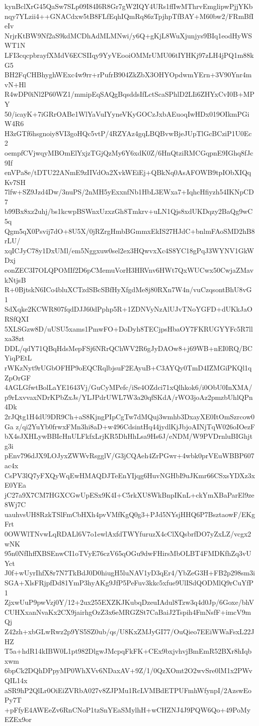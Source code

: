 kynBclXrG45QaSw7SLp09I84I6R8Gr7gW2IQY4URs1ffIwMThrvEmglipwPjjYKb
nqy7YLzii4++GNACdxw5tB8FLfEqhIQmRq86zTpjhpTfBAY+M60bw2/FRmBfIeIv
NrjrKtBW9Nf2aS9kdMCDhAdMLMNwi/y6Q+gKjL8WuXjunjys9BIq1eodHyWSWT1N
LFI3cqcpbrayfXMdV6ECSIIqy9YyVEooiOMMrUMU06tIYHKj97zLH4jPQ1m88kG5
BH2FqCHBhyghWExc4w9rr+rPufrB904ZkZbX3OHYOpdwmYErn+3V90Ynr4mvN+Hl
R4wDP0iNl2P60WZ1/mmipEqSAQgBqsddsIfLctScaSPhlD2LIi6ZHYxCvI0B+MPY
50/icayK+7iGRrOABe1WlYaVuIYyneVKyGOCzJxbAEuoqIwHDx019OIkmPGiW4R6
H3zGTf6hsgnoiy8VI3goHQc5vtP/4RZYAz4gqLBQBvwBjeJUpTlGcBCziP1U0Ec2
oempfCVjwqyMBOmElYxjzTGjQzMy6Y6xdK0Z/6HnQtziRMCGqpnE9IGhq8fJc9If
enVPa8e/tDTU22ANmE9zIIVdOa2XvkWEiEj+QBkNq0AsAFOWB9tpIObXIQqKv7SH
7lfw+SZ9Jzd4Dw/3nuPS/2nMH5yExxnfNb1HbL3EWxa7+IqhcHfiyzh54IKNpCD7
b99Bx8xz2uhj/bs1kcwpBSWnxUzxzGh8Tmkrv+uLN1Qjs8xdUKDqzy2BaQg9wC5q
Qgm5qX0Psvij7dO+8U5X/0jRZrgHmbBGmmxEkIS27HJdC+bnlmFAoSMD2hB8rLU/
xqICJyC78y1DxUMl/em5Nggxuw0sel2ex3HQwvxXc4S8YC18gPqJ3WYNV1GkWDxj
eonZEC3I7OLQPOMIf2D6pCMemuVorH3HRVnv6HWt7QxWUCwx50CwjaZMavkNtjsB
R+0BjtskN6ICo4bluXCTzdSBcSBfHyXfgdMe8j80RXn7W4n/vuCzqsontBhU8vG1
SdXqke2KCWR807fqdDJJ60dPphp5R+1ZDNVyNzAlUJvTNoYGFD+dUKkJaORSfQXI
5XLSGzw8D/uUSU5xams1PmwFO+DoDyh8TECjpsHbaOY7FKRUGYYFc5R7llxa38zt
DDL/qdY71QBqHdsMepFSj6NRrQChWV2R6gJyDAOw8+j69WB+nEI0RQ/BCYiqPEtL
rWKzNyt9rUGbOFHP9oEQCRqlbjsuF2EAyuB+C3AYQy0TmD4IZMGiPKQl1qZpOrGF
4AGLGfwtBolLaYE1643Vj/GuCyMPefc/iSe4OZdci71xQlhkok6/i0ObU0InXMA/
p9rLxvvaxNDrKPbZxJs/YLJPdrUWL7W3a20qfSKdA/rWO3joAz2pmzbUhlQPn4Dk
2rJQtg1H4dU9DR9Ch+aS8KjngPIpCgTw7dMQuj3wmhb3DxayXE0ItOmSzrcow0Ga
z/qi2YuYb0frwxFMn3hi8aD+w496CdsintHq44jydlKjJbjoAINjTqW026oIOezF
bX4sJXHLywBBIcHnULFkfxLrjKR5DhHhLsa9Hs6J/eNDM/W9PVDrnluBIGhjtg3i
pEnv796dJX9LOJyxZWWvRsgglV/G3jCQAeh4ZrPGwr+4wbk0prVEuWBBP607ac4x
CsPV3lQ7yFXQyWqEwHMAQDJTeEnYIjqg6HuvNGHbI9uJKmr66CSxsYDXz3xE0YEa
jC27a9X7CM7HGXCGwUpESx9K4I+C5rkXU8WkBnpIKnL+ckYmXBaParEl9ze8Wj7C
uauhvsUH8RzkTSlFmCbHXh4pvVMfKgQ0g3+PJd5NYsjHHQ6P7BsztaowF/EKgFrt
0OWWlTNvwLqRDALl6V7o1ewlAxfdTWYfuruzX4cClXQsbrfDO7yZxLZ/vcgx2wNK
95n0NfIhffXBSEnwCI1oTVyE76czV65qOGu9dwFHirsMbOLBT4FMDKfhZq3vUYct
J0f+wUyrIhfX8r7N7TkBdJ0D0hiugH5luNAV1yD3qEr4/YbZeG3H+FB2p298sm3i
SGA+XlsFRjpfDd81YmP3hyAKg9JfP5PeFuv3kkc5xfue9UlISdQODMlQ9rCuYfP1
ZjxwUuP9pwVzj0Y/12+2ux255EXZKJKubqDzeuIAdul8Tzw3q4d0Jp/6Goxe/bhV
CUHXxanNvaKx2CX9jairhgOzZ3x6eMRGZSt7CaBaiJ2Tspih4FmNsfF+imcV9mQj
Z42zh+xbGLwRwz2p9YS5SZ0ub/qs/U8KxZMJyGI77/OuQieo7EEiWWaFsxL22JHZ
T5a+hdR14kIBW0L1pt982DlgwJMcpqFkFK+CEx9bxjvhvjBmEmR52BXr8hIqbxwm
6bpCk2DQhDPpyMP0WhXVv6NDaxAV+9Z/1/0QzXOmt2O2wvSre0lM1x2PWvQIL14x
aSR9hP2QlLr0OiEiZVRbA027v8ZJPMu1RcLVMBdETPUFmhWfynpI/2AzswEoPy7T
+pFfyE4AWEeZv6RnCNoP1tzSnYEaSMylhH+wCHZNJ4J9PQW6Qo+49PoMyEZEx9or
